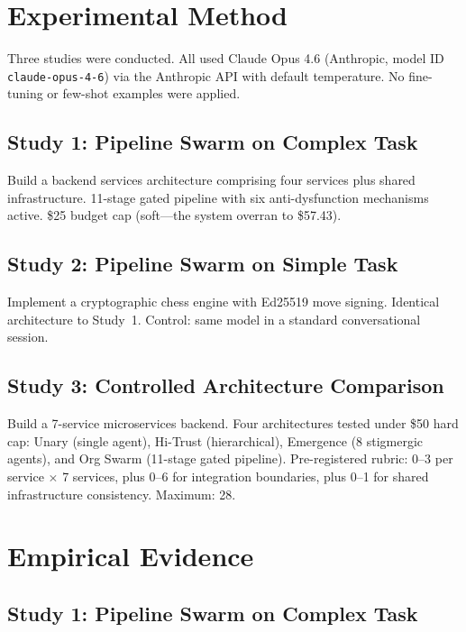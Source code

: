 \documentclass[11pt,a4paper]{article}
\begin{document}
\section{Experimental Method}
\label{sec:method}

Three studies were conducted. All used Claude Opus 4.6 (Anthropic, model ID \texttt{claude-opus-4-6}) via the Anthropic API with default temperature. No fine-tuning or few-shot examples were applied.

\subsection{Study 1: Pipeline Swarm on Complex Task}

Build a backend services architecture comprising four services plus shared infrastructure. 11-stage gated pipeline with six anti-dysfunction mechanisms active. \$25 budget cap (soft---the system overran to \$57.43).

\subsection{Study 2: Pipeline Swarm on Simple Task}

Implement a cryptographic chess engine with Ed25519 move signing. Identical architecture to Study~1. Control: same model in a standard conversational session.

\subsection{Study 3: Controlled Architecture Comparison}

Build a 7-service microservices backend. Four architectures tested under \$50 hard cap: Unary (single agent), Hi-Trust (hierarchical), Emergence (8 stigmergic agents), and Org Swarm (11-stage gated pipeline). Pre-registered rubric: 0--3 per service $\times$ 7 services, plus 0--6 for integration boundaries, plus 0--1 for shared infrastructure consistency. Maximum: 28.


\section{Empirical Evidence}
\label{sec:evidence}

\subsection{Study 1: Pipeline Swarm on Complex Task}
\end{document}
